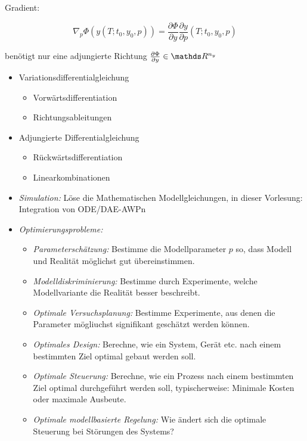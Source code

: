 Gradient:

\[ \nabla_p \Phi(y(T; t_0, y_0,p)) = \frac{\partial \Phi}{\partial y} \frac{\partial y}{\partial p} (T; t_0,y_0,p) \]

benötigt nur eine adjungierte Richtung $\tfrac{\partial \Phi}{\partial y} \in \R^{n_y}$


\begin{itemize}
\item Variationsdifferentialgleichung
\begin{itemize}
	\item Vorwärtsdifferentiation
	\item Richtungsableitungen
\end{itemize}
\item Adjungierte Differentialgleichung
\begin{itemize}
	\item Rückwärtsdifferentiation
	\item Linearkombinationen
\end{itemize}
\end{itemize}



\begin{itemize}
\item \emph{Simulation:} Löse die Mathematischen Modellgleichungen, in dieser Vorlesung: Integration von ODE/DAE-AWPn
\item \emph{Optimierungsprobleme:}
\begin{itemize}
	\item \emph{Parameterschätzung:} Bestimme die Modellparameter $p$ so, dass Modell und Realität möglichst gut übereinstimmen.
	\item \emph{Modelldiskriminierung:} Bestimme durch Experimente, welche Modellvariante die Realität besser beschreibt.
	\item \emph{Optimale Versuchsplanung:} Bestimme Experimente, aus denen die Parameter mögliuchst signifikant geschätzt werden können.
	\item \emph{Optimales Design:} Berechne, wie ein System, Gerät etc. nach einem bestimmten Ziel optimal gebaut werden soll.
	\item \emph{Optimale Steuerung:} Berechne, wie ein Prozess nach einem bestimmten Ziel optimal durchgeführt werden soll, typischerweise: Minimale Kosten oder maximale Ausbeute.
	\item \emph{Optimale modellbasierte Regelung:} Wie ändert sich die optimale Steuerung bei Störungen des Systems?
\end{itemize}
\end{itemize}













